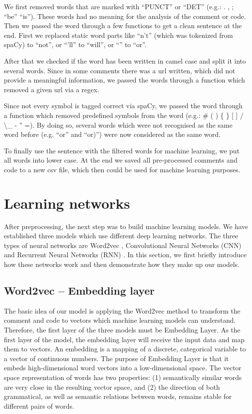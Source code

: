 \documentclass[runningheads]{llncs}
\begin{document}
We first removed words that are marked with ``PUNCT'' or ``DET'' (e.g.: . , ; ``be'' ``is''). These words had no meaning for the analysis of the comment or code.
Then we passed the word through a few functions to get a clean sentence at the end. First we replaced static word parts like ``n't'' (which was tokenized from spaCy) to ``not'', or ``'ll'' to ``will'', or ``\textbar\textbar'' to ``or''.

After that we checked if the word has been written in camel case and split it into several words. Since in some comments there was a url written, which did not provide a meaningful information, we passed the words through a function
which removed a given url via a regex.

Since not every symbol is tagged correct via spaCy, we passed the word through a function which removed predefined symbols from the word (e.g.: \# ( ) \{ \} [ ] / \textbackslash \_ - '' =).
By doing so, several words which were not recognised as the same word before (e.g. ``or'' and ``or)'') were now considered as the same word.

To finally use the sentence with the filtered words for machine learning, we put all words into lower case.
At the end we saved all pre-processed comments and code to a new csv file, which then could be used for machine learning purposes.


\section{Learning networks}
After preprocessing, the next step was to build machine learning models. We have established three models which use different deep learning networks. The three types of neural networks are Word2vec \cite{ref_mikolov}, Convolutional Neural Networks (CNN) \cite{ref_yoon} and Recurrent Neural Networks (RNN) \cite{ref_rnn}. In this section, we first briefly introduce how these networks work and then demonstrate how they make up our models.

\subsection{Word2vec -- Embedding layer}
The basic idea of our model is applying the Word2vec method to transform the comment and code to vectors which machine learning models can understand. Therefore, the first layer of the three models must be Embedding Layer. As the first layer of the model, the embedding layer will receive the input data and map them to vectors. An embedding is a mapping of a discrete, categorical variable to a vector of continuous numbers. The purpose of Embedding Layer is that it embeds high-dimensional word vectors into a low-dimensional space. The vector space representation of words has two properties: (1) semantically similar words are very close in the resulting vector space, and (2) the direction of both grammatical, as well as semantic relations between words, remains stable for different pairs of words. 
\end{document}
